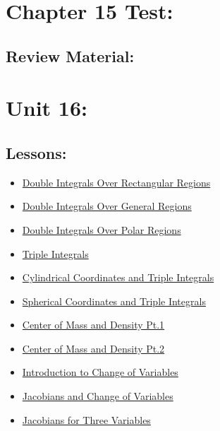 \documentclass[9pt]{amsart}
\begin{document}
\section{Chapter 15 Test:}
    \subsection{Review Material:}

\section{Unit 16:}
    \subsection{Lessons:}
        \begin{itemize}
            \item \href{https://www.youtube.com/watch?v=Ytj-Gbl1KDY&list=PLVOT1I6lLvjfDhACPSMXam2diM0IBR3hl&index=20}{Double Integrals Over Rectangular Regions}
            \item \href{https://www.youtube.com/watch?v=xrHwl5r1rJA&list=PLVOT1I6lLvjfDhACPSMXam2diM0IBR3hl&index=21}{Double Integrals Over General Regions}
            \item \href{https://www.youtube.com/watch?v=-IMve2eGg9I&list=PLVOT1I6lLvjfDhACPSMXam2diM0IBR3hl&index=22}{Double Integrals Over Polar Regions}
            \item \href{https://www.youtube.com/watch?v=jNyhF-AjWFw&list=PLVOT1I6lLvjfDhACPSMXam2diM0IBR3hl&index=23}{Triple Integrals}
            \item \href{https://www.youtube.com/watch?v=sWEyTlzSY3E&list=PLVOT1I6lLvjfDhACPSMXam2diM0IBR3hl&index=24}{Cylindrical Coordinates and Triple Integrals}
            \item \href{https://www.youtube.com/watch?v=BbL3nfgm-as&list=PLVOT1I6lLvjfDhACPSMXam2diM0IBR3hl&index=25}{Spherical Coordinates and Triple Integrals}
            \item \href{https://www.youtube.com/watch?v=wZcT1D2x4bs&list=PLVOT1I6lLvjfDhACPSMXam2diM0IBR3hl&index=26}{Center of Mass and Density Pt.1}
            \item \href{http://youtube.com/watch?v=k_FCcJ51S0c&list=PLVOT1I6lLvjfDhACPSMXam2diM0IBR3hl&index=27}{Center of Mass and Density Pt.2}
            \item \href{https://www.youtube.com/watch?v=lp-ZTiy1_sw&list=PLVOT1I6lLvjfDhACPSMXam2diM0IBR3hl&index=28}{Introduction to Change of Variables}
            \item \href{https://www.youtube.com/watch?v=WMAPaIM2xIA&list=PLVOT1I6lLvjfDhACPSMXam2diM0IBR3hl&index=29}{Jacobians and Change of Variables}
            \item \href{https://www.youtube.com/watch?v=s2dLHMnRpms&list=PLVOT1I6lLvjfDhACPSMXam2diM0IBR3hl&index=30}{Jacobians for Three Variables}
        \end{itemize}
    
\end{document}

